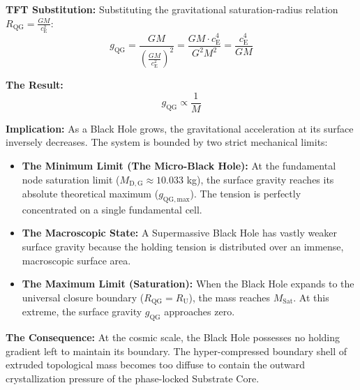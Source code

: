 \vspace{0.5em}
\noindent\textbf{TFT Substitution:} Substituting the gravitational saturation-radius relation $R_{\mathrm{QG}} = \frac{GM}{c_{\mathrm{E}}^2}$:
\begin{equation}
    g_{\mathrm{QG}} = \frac{GM}{\left(\frac{GM}{c_{\mathrm{E}}^2}\right)^2} = \frac{GM \cdot c_{\mathrm{E}}^4}{G^2 M^2} = \frac{c_{\mathrm{E}}^4}{GM}
\end{equation}

\noindent\textbf{The Result:}
\begin{equation}
    g_{\mathrm{QG}} \propto \frac{1}{M}
\end{equation}

\noindent\textbf{Implication:} As a Black Hole grows, the gravitational acceleration at its surface inversely decreases. The system is bounded by two strict mechanical limits:

\begin{itemize}
    \item \textbf{The Minimum Limit (The Micro-Black Hole):} At the fundamental node saturation limit ($M_{\mathrm{D,G}} \approx 10.033$ kg), the surface gravity reaches its absolute theoretical maximum ($g_{\mathrm{QG, \mathrm{max}}}$). The tension is perfectly concentrated on a single fundamental cell.
    \item \textbf{The Macroscopic State:} A Supermassive Black Hole has vastly weaker surface gravity because the holding tension is distributed over an immense, macroscopic surface area.
    \item \textbf{The Maximum Limit (Saturation):} When the Black Hole expands to the universal closure boundary ($R_{\mathrm{QG}} = R_{\mathrm{U}}$), the mass reaches $M_{\mathrm{Sat}}$. At this extreme, the surface gravity $g_{\mathrm{QG}}$ approaches zero.
\end{itemize}

\noindent\textbf{The Consequence:} At the cosmic scale, the Black Hole possesses no holding gradient left to maintain its boundary. The hyper-compressed boundary shell of extruded topological mass becomes too diffuse to contain the outward crystallization pressure of the phase-locked Substrate Core.

